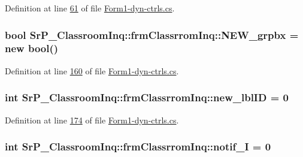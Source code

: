 \-Definition at line \hyperlink{_form1-dyn-ctrls_8cs_source_l00061}{61} of file \hyperlink{_form1-dyn-ctrls_8cs_source}{\-Form1-\/dyn-\/ctrls.\-cs}.

\hypertarget{class_sr_p___classroom_inq_1_1frm_classrrom_inq_aaf5a152b29ae06c11e8e25f0eabf454d}{
\subsubsection[{\-N\-E\-W\-\_\-grpbx}]{\setlength{\rightskip}{0pt plus 5cm}bool {\bf \-Sr\-P\-\_\-\-Classroom\-Inq\-::frm\-Classrrom\-Inq\-::\-N\-E\-W\-\_\-grpbx} = new bool()}}
\label{class_sr_p___classroom_inq_1_1frm_classrrom_inq_aaf5a152b29ae06c11e8e25f0eabf454d}


\-Definition at line \hyperlink{_form1-dyn-ctrls_8cs_source_l00160}{160} of file \hyperlink{_form1-dyn-ctrls_8cs_source}{\-Form1-\/dyn-\/ctrls.\-cs}.

\hypertarget{class_sr_p___classroom_inq_1_1frm_classrrom_inq_a561cfd5c0d34d4adcb14aee4efc01643}{
\subsubsection[{new\-\_\-lbl\-I\-D}]{\setlength{\rightskip}{0pt plus 5cm}int {\bf \-Sr\-P\-\_\-\-Classroom\-Inq\-::frm\-Classrrom\-Inq\-::new\-\_\-lbl\-I\-D} = 0}}
\label{class_sr_p___classroom_inq_1_1frm_classrrom_inq_a561cfd5c0d34d4adcb14aee4efc01643}


\-Definition at line \hyperlink{_form1-dyn-ctrls_8cs_source_l00174}{174} of file \hyperlink{_form1-dyn-ctrls_8cs_source}{\-Form1-\/dyn-\/ctrls.\-cs}.

\hypertarget{class_sr_p___classroom_inq_1_1frm_classrrom_inq_a55f84efe1ba2cfb49d836798a1db3477}{
\subsubsection[{notif\-\_\-\-I}]{\setlength{\rightskip}{0pt plus 5cm}int {\bf \-Sr\-P\-\_\-\-Classroom\-Inq\-::frm\-Classrrom\-Inq\-::notif\-\_\-\-I} = 0}}
\label{class_sr_p___classroom_inq_1_1frm_classrrom_inq_a55f84efe1ba2cfb49d836798a1db3477}


